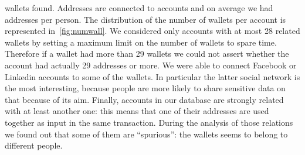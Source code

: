 wallets found.
Addresses are connected to \accountNumber{} accounts and on average we had
\avarageAccount{} addresses per person.
The distribution of the number of wallets per account is represented
in~\autoref{fig:numwall}. We considered only accounts with at most 28 related
wallets by setting a maximum limit on the number of
wallets to spare time.
Therefore if a wallet had more than 29 wallets we could not assert whether
the account had actually 29 addresses or more.
We were able to connect Facebook or Linkedin accounts to some of the wallets.
In particular the latter social network is the most interesting, because people
are more likely to share sensitive data on that because of its aim.
Finally, \accountRelated{} accounts in our database are strongly related with
at least another one: this means that one of their addresses are used together
as input in the same transaction. During the analysis of those relations we
found out that some of them are ``spurious'': the wallets seems to belong to
different people.

